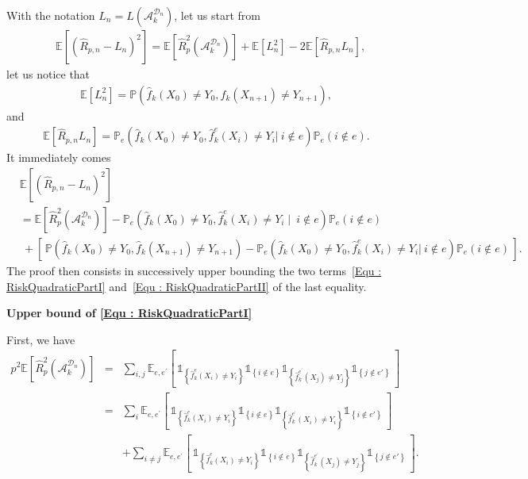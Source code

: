 \documentclass[twoside,11pt]{article}
\numberwithin{equation}{section}
\newcommand{\esp}[1]{\mathbb{E}\left[#1 \right]}
\newcommand{\f}[1]{ \widehat{f}_k( #1 ) }
\newcommand{\fe}[1]{ \widehat{f}_k^e(#1 ) }
\newcommand{\fep}[1]{ \widehat{f}_k^{e^\prime}(#1 ) }
\newcommand{\ga}[1]{\left\{#1\right\}}
\newcommand{\1}{\mathds{1}}%
\newcommand{\ind}[1]{\1_{\ga{#1}}}%
\newcommand{\paren}[1]{\left( #1 \right)}
\newcommand{\croch}[1]{\left[\, #1 \,\right]}
\newcommand{\E}{\mathbb{E}}
\renewcommand{\P}{\mathbb{P}}
\newcommand{\Rh}{\widehat{R}}
\newcommand{\Dn}{\mathcal{D}_n}
\newcommand{\A}{\mathcal{A}}
\numberwithin{equation}{section}
\theoremstyle{plain}
\begin{document}
With the notation $L_n = L(\A_k^{\Dn})$, let us start from
\begin{align*}
& \esp{(\Rh_{p,n}-L_n)^2} = \esp{\Rh_p^2(\A_k^{\Dn})} + \esp{L_n^2} - 2\esp{\Rh_{p,n} L_n},
\end{align*}
%
let us notice that
\begin{align*}
  \esp{L_n^2} =  \P\paren{\f{X_0}\neq Y_0,\f{X_{n+1}}\neq Y_{n+1}} ,
\end{align*}
and
\begin{align*}
\esp{\Rh_{p,n} L_n} =  \P_e\paren{\f{X_0}\neq Y_0,\fe{X_{i}}\neq Y_{i}| \ i \notin e}  \P_e\paren{ i \not\in e} .
\end{align*}
%
It immediately comes
\begin{align}
& \esp{(\Rh_{p,n}-L_n)^2} \nonumber\\
%
&=   \esp{\Rh_p^2(\A_k^{\Dn})} -  \P_e\paren{\f{X_0}\neq Y_0,\fe{X_{i}}\neq Y_{i}\mid \ i \notin e}  \P_e\paren{ i \not\in e} \label{Equ : RiskQuadraticPartI}\\
%
& \ + \croch{ \P\paren{\f{X_0}\neq Y_0,\f{X_{n+1}}\neq Y_{n+1}} -  \P_e\paren{\f{X_0}\neq Y_0,\fe{X_{i}}\neq Y_{i}| \ i \notin e}  \P_e\paren{ i \notin e} } \label{Equ : RiskQuadraticPartII}.
\end{align}
%
The proof then consists in successively upper bounding the two terms~\eqref{Equ : RiskQuadraticPartI} and~\eqref{Equ : RiskQuadraticPartII} of the last equality.
%

\medskip

\noindent\textbf{Upper bound of \eqref{Equ : RiskQuadraticPartI}}

First, we have
\begin{eqnarray*}
p^2 \esp{\Rh_p^2(\A_k^{\Dn})} &=& \sum_{i,j} \E_{e,e^\prime} \croch{\ind{\fe{X_i}\neq Y_i}\ind{i \notin e}\ind{\fep{X_j}\neq Y_j}\ind{j \notin e'}} \\
%
&=& \sum_{i}\E_{e,e^\prime} \croch{\ind{\fe{X_i}\neq Y_i}\ind{i \notin e}\ind{\fep{X_i}\neq Y_i}\ind{i \notin e'}}\\
& & +\sum_{i\neq j}\E_{e,e^\prime} \croch{\ind{\fe{X_i}\neq Y_i}\ind{i \notin e}\ind{\fep{X_j}\neq Y_j}\ind{j \notin e'}} .
\end{eqnarray*}
\end{document}
